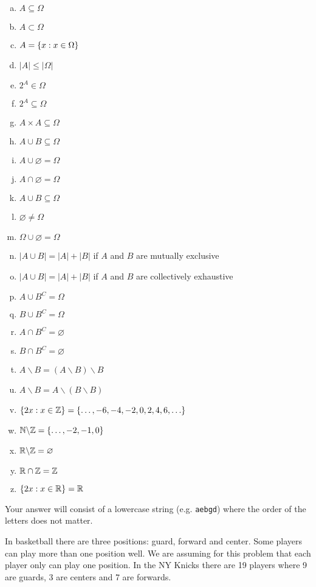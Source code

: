 \documentclass[12pt,landscape]{article}
\newcommand{\instr}{\small Your answer will consist of a lowercase string (e.g. \texttt{aebgd}) where the order of the letters does not matter. \normalsize}
\begin{document}
\vspace{-0.2cm}\benum{} 
\begin{multicols}{2}
\begin{enumerate}[(a)]
\item $A \subseteq \Omega$
\item $A \subset \Omega$
\item $A = \left\{x : x \in \Omega\right\}$
\item $|A| \leq |\Omega|$
\item $2^A \in \Omega$
\item $2^A \subseteq \Omega$
\item $A \times A \subseteq \Omega$
\item $A \cup B \subseteq \Omega$
\item $A \cup \varnothing = \Omega$
\item $A \cap \varnothing = \Omega$
\item $A \cup B \subseteq \Omega$
\item $\varnothing \neq \Omega$
\item $\Omega \cup \varnothing = \Omega$
\item $|A \cup B| = |A| + |B|$ if $A$ and $B$ are mutually exclusive
\item $|A \cup B| = |A| + |B|$ if $A$ and $B$ are collectively exhaustive
\item $A \cup B^C = \Omega$
\item $B \cup B^C = \Omega$
\item $A \cap B^C = \varnothing$
\item $B \cap B^C = \varnothing$
\item $A \backslash B = (A \backslash B) \backslash B$ 
\item $A \backslash B = A \backslash (B \backslash B)$ 
\item $\left\{2x : x \in \mathbb{Z}\right\} = \left\{\ldots, -6, -4, -2, 0, 2, 4, 6, \ldots\right\}$
\item $\mathbb{N} \backslash \mathbb{Z} = \left\{\ldots, -2, -1, 0\right\}$
\item $\mathbb{R} \backslash \mathbb{Z} = \varnothing$
\item $\mathbb{R} \cap \mathbb{Z} = \mathbb{Z}$
\item $\left\{2x : x \in \mathbb{R}\right\} = \mathbb{R}$
\end{enumerate}
\end{multicols}
\eenum\instr\pagebreak

\problem{} In basketball there are three positions: guard, forward and center. Some players can play more than one position well. We are assuming for this problem that each player only can play one position. In the NY Knicks there are 19 players where 9 are guards, 3 are centers and 7 are forwards. 
\end{document}
